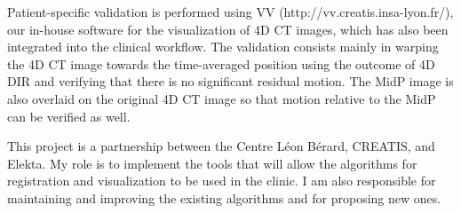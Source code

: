 \documentclass[a4paper]{article}
\begin{document}
Patient-specific validation is performed using VV (http://vv.creatis.insa-lyon.fr/), our in-house software for the visualization of 4D CT images, which has also been integrated into the clinical workflow. The validation consists mainly in warping the 4D CT image towards the time-averaged position using the outcome of 4D DIR and verifying that there is no significant residual motion. The MidP image is also overlaid on the original 4D CT image so that motion relative to the MidP can be verified as well.

This project is a partnership between the Centre L\'eon B\'erard, CREATIS, and Elekta. My role is to implement the tools that will allow the algorithms for registration and visualization to be used in the clinic. I am also responsible for maintaining and improving the existing algorithms and for proposing new ones.

\renewcommand{\refname}{Related publications}
\begin{bibunit}[unsrt]
\nocite{DELM-11}
\nocite{PINH-11}
\nocite{RIT-11b}
\putbib[mybib]
\end{bibunit}
\end{document}
